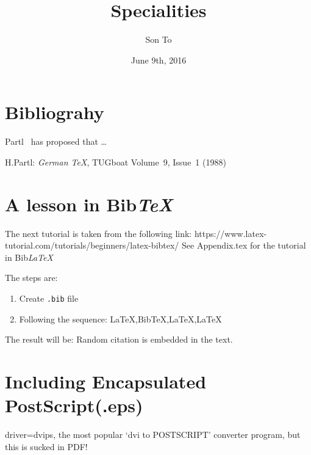 \documentclass[a4paper,11pt]{article}
\author{Son To}
\date{June 9th, 2016}
\title{Specialities}
\begin{document}
  \maketitle
  \tableofcontents
  \newpage
  \section{Bibliograhy}
Partl~\cite{pa} has
proposed that \ldots
  \begin{thebibliography}{99}
    H.Partl:
    \emph{German \TeX},
    TUGboat Volume~9, Issue~1 (1988)
  \end{thebibliography}

\section{A lesson in Bib\emph{TeX}}
The next tutorial is taken from the
following link: https://www.latex-tutorial.com/tutorials/beginners/latex-bibtex/
See Appendix.tex for the tutorial in Bib\emph{LaTeX}

The steps are:
\flushleft
\begin{enumerate}
  \item Create \verb+.bib+ file
  \item Following the sequence: La\TeX,Bib\TeX,La\TeX,La\TeX
\end{enumerate}
The result will be:
Random citation \cite{DUMMY:1} is embedded in the text.
\newpage



\section{Including Encapsulated PostScript(.eps)}
driver=dvips, the most popular `dvi to POSTSCRIPT'
converter program, but this is sucked in PDF!
\end{document}
